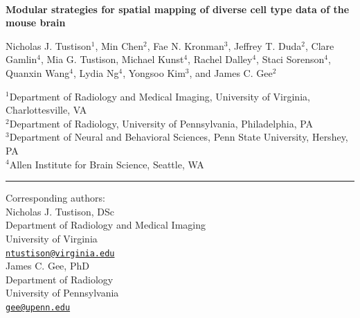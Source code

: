 \documentclass[
  12pt,
]{article}
\author{}
\date{\vspace{-2.5em}}
\begin{document}
\linenumbers
{}


\begin{centering}

$ $

\vspace{6cm}

\LARGE

{\bf Modular strategies for spatial mapping of diverse cell type data of the mouse brain}

\vspace{1.0 cm}

\normalsize

Nicholas J. Tustison$^{1}$,
Min Chen$^{2}$,
Fae N. Kronman$^{3}$,
Jeffrey T. Duda$^{2}$,
Clare Gamlin$^{4}$,
Mia G. Tustison,
Michael Kunst$^{4}$,
Rachel Dalley$^{4}$,
Staci Sorenson$^{4}$,
Quanxin Wang$^{4}$,
Lydia Ng$^{4}$,
Yongsoo Kim$^{3}$, and
James C. Gee$^{2}$

\small

$^{1}$Department of Radiology and Medical Imaging, University of Virginia, Charlottesville, VA \\
$^{2}$Department of Radiology, University of Pennsylvania, Philadelphia, PA \\
$^{3}$Department of Neural and Behavioral Sciences, Penn State University, Hershey, PA \\
$^{4}$Allen Institute for Brain Science, Seattle, WA \\

\end{centering}

\vspace{3.5 cm}

\noindent

\rule{4cm}{0.4pt}

\scriptsize

Corresponding authors:\\

Nicholas J. Tustison, DSc\\
Department of Radiology and Medical Imaging\\
University of Virginia\\
\href{mailto:ntustison@virginia.edu}{\nolinkurl{ntustison@virginia.edu}}\\

James C. Gee, PhD\\
Department of Radiology\\
University of Pennsylvania\\
\href{mailto:gee@upenn.edu}{\nolinkurl{gee@upenn.edu}}
\end{document}
